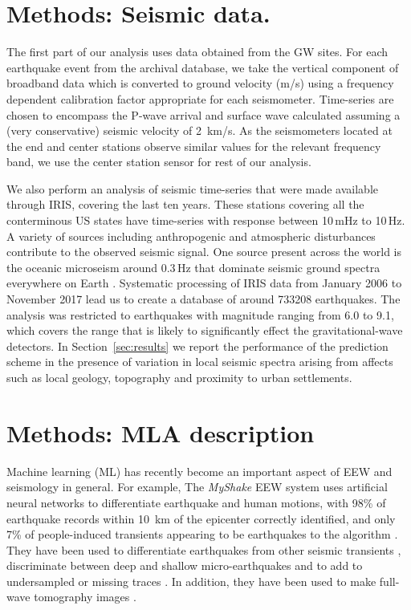 \documentclass[twocolumn, aps, superscriptaddress]{revtex4}
\begin{document}
\section{Methods: Seismic data.}\label{sec:data}

The first part of our analysis uses data obtained from the GW sites. For each earthquake event from the archival database, we take the vertical component of broadband data which is converted to ground velocity (m/s) using a frequency dependent calibration factor appropriate for each seismometer. Time-series are chosen to encompass the P-wave arrival and surface wave calculated assuming a (very conservative) seismic velocity of 2\, km/s. As the seismometers located at the end and center stations observe similar values for the relevant frequency band, we use the center station sensor for rest of our analysis.

We also perform an analysis of seismic time-series that were made available through IRIS, covering the last ten years. These stations covering all the conterminous US states have time-series with response between 10\,mHz to 10\,Hz.  A variety of sources including anthropogenic and atmospheric disturbances contribute to the observed seismic signal. One source present across the world is the oceanic microseism around 0.3\,Hz that dominate seismic ground spectra everywhere on Earth \cite{HMS1963,ToLa1968,Ces1994,FKK1998}. Systematic processing of IRIS data from January 2006 to November 2017 lead us to create a database of around 733208 earthquakes. The analysis was restricted to earthquakes with magnitude ranging from 6.0 to 9.1, which covers the range that is likely to significantly effect the gravitational-wave detectors. In Section~\ref{sec:results} we report the performance of the prediction scheme in the presence of variation in local seismic spectra arising from affects such as local geology, topography and proximity to urban settlements.

\section{Methods: MLA description} \label{sec:MLA}

Machine learning (ML) has recently become an important aspect of EEW and seismology in general. For example,
The \emph{MyShake} EEW system uses artificial neural networks to differentiate earthquake and human motions, with 98\% of earthquake records within 10\, km of the epicenter correctly identified, and only 7\% of people-induced transients appearing to be earthquakes to the algorithm  \cite{KoAl2016}.
They have been used to differentiate earthquakes from other seismic transients \cite{KuYi2011,KoUs2016,PeGh2017}, discriminate between deep and shallow micro-earthquakes \cite{MoHo2016} and to add to undersampled or missing traces \cite{JiMa2017}. In addition, they have been used to make full-wave tomography images \cite{DiLe2011}.
\end{document}

